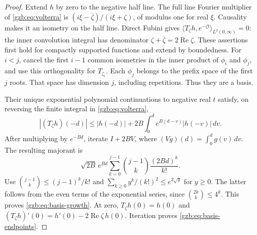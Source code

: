 \documentclass[11pt,a4paper]{article}
\numberwithin{equation}{section}
\theoremstyle{definition}\newtheorem{definition}[theorem]{Definition}
\theoremstyle{remark}\newtheorem{remark}[theorem]{Remark}
\newcommand{\ip}[2]{\langle#1,#2\rangle}\newcommand{\norm}[1]{\lVert#1\rVert}\newcommand{\abs}[1]{\lvert#1\rvert}
\DeclareMathOperator{\Rea}{Re}\DeclareMathOperator{\Ima}{Im}
\begin{document}
\begin{proof}
Extend $h$ by zero to the negative half line. The full line Fourier
multiplier of \eqref{gzb:eq:volterra} is
$(i\xi-\overline\zeta)/(i\xi+\zeta)$, of modulus one for real $\xi$.
Causality makes it an isometry on the half line.
Direct Fubini gives
$\ip{T_\zeta h}{e^{-\zeta t}}_{L^2(0,\infty)}=0$:
the inner convolution integral has denominator
$\zeta+\overline\zeta=2\Rea\zeta$.
These assertions first hold for compactly supported functions and extend
by boundedness.
For $i<j$, cancel the first $i-1$ common isometries in the inner product
of $\phi_i$ and $\phi_j$, and use this orthogonality for $T_{\zeta_i}$.
Each $\phi_j$ belongs to the prefix space of the first $j$ roots.
That space has dimension $j$, including repetitions. Thus they are a basis.

Their unique exponential polynomial continuations to negative real $t$
satisfy, on reversing the finite integral in \eqref{gzb:eq:volterra},
\[
 |(T_\zeta h)(-d)|\le |h(-d)|+
       2B\int_0^d e^{B(d-v)}|h(-v)|\,dv.
\]
After multiplying by $e^{-Bd}$, iterate $I+2BV$, where
$(Vg)(d)=\int_0^d g(v)\,dv$. The resulting majorant is
\[
 \sqrt{2B}\,e^{Bd}\sum_{k=0}^{j-1}
          \binom{j-1}{k}\frac{(2Bd)^k}{k!}.
\]
Use $\binom{j-1}{k}\le(j-1)^k/k!$ and
$\sum_{k\ge0}y^k/(k!)^2\le e^{2\sqrt y}$ for $y\ge0$.
The latter follows from the even terms of the exponential series, since
$\binom{2k}{k}\le4^k$. This proves \eqref{gzb:eq:basis-growth}.
At zero, $T_\zeta h(0)=h(0)$ and
$(T_\zeta h)'(0)=h'(0)-2\Rea\zeta\,h(0)$.
Iteration proves \eqref{gzb:eq:basis-endpoints}.
\end{proof}
\end{document}
